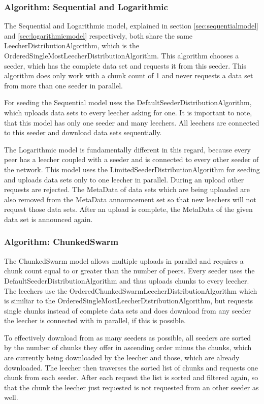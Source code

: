 \subsubsection{Algorithm: Sequential and Logarithmic}
\label{subsubsec:seqlog}
The Sequential and Logarithmic model, explained in section \ref{sec:sequentialmodel} and \ref{sec:logarithmicmodel} respectively, both share the same LeecherDistributionAlgorithm, which is the OrderedSingleMostLeecherDistributionAlgorithm. This algorithm chooses a seeder, which has the complete data set and requests it from this seeder. This algorithm does only work with a chunk count of 1 and never requests a data set from more than one seeder in parallel.

For seeding the Sequential model uses the DefaultSeederDistributionAlgorithm, which uploads data sets to every leecher asking for one. It is important to note, that this model has only one seeder and many leechers. All leechers are connected to this seeder and download data sets sequentially. 

The Logarithmic model is fundamentally different in this regard, because every peer has a leecher coupled with a seeder and is connected to every other seeder of the network. This model uses the LimitedSeederDistributionAlgorithm for seeding and uploads data sets only to one leecher in parallel. During an upload other requests are rejected. The MetaData of data sets which are being uploaded are also removed from the MetaData announcement set so that new leechers will not request those data sets. After an upload is complete, the MetaData of the given data set is announced again.

\subsubsection{Algorithm: ChunkedSwarm}
\label{subsubsec:chunkedswarm}
The ChunkedSwarm model allows multiple uploads in parallel and requires a chunk count equal to or greater than the number of peers. Every seeder uses the DefaultSeederDistributionAlgorithm and thus uploads chunks to every leecher. The leechers use the OrderedChunkedSwarmLeecherDistributionAlgorithm which is similiar to the OrderedSingleMostLeecherDistributionAlgorithm, but requests single chunks instead of complete data sets and does download from any seeder the leecher is connected with in parallel, if this is possible. 

To effectively download from as many seeders as possible, all seeders are sorted by the number of chunks they offer in ascending order minus the chunks, which are currently being downloaded by the leecher and those, which are already downloaded. The leecher then traverses the sorted list of chunks and requests one chunk from each seeder. After each request the list is sorted and filtered again, so that the chunk the leecher just requested is not requested from an other seeder as well. 

